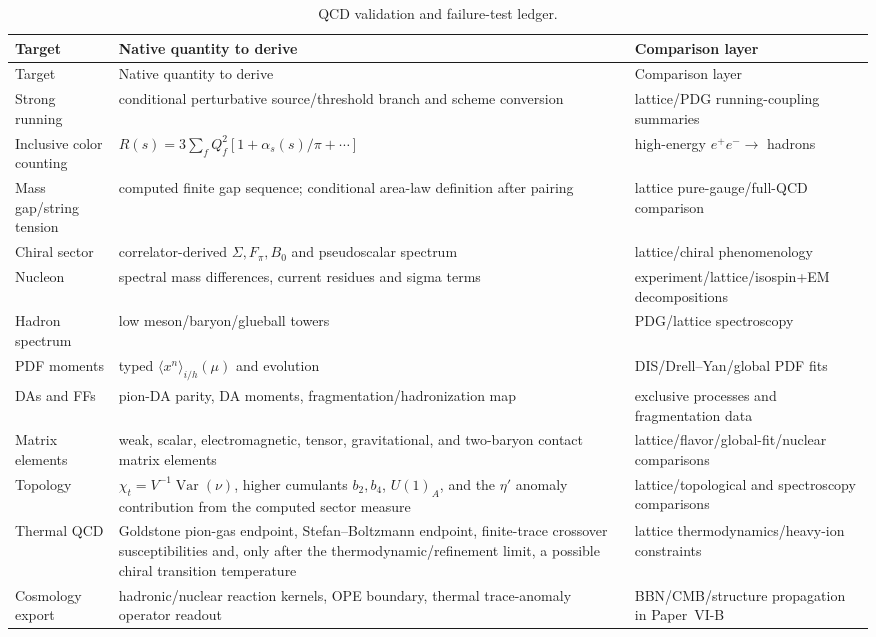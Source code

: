 \documentclass[12pt,a4paper]{article}
\begin{document}
\begin{longtable}{>{\raggedright\arraybackslash}p{} >{\raggedright\arraybackslash}p{} >{\raggedright\arraybackslash}p{}}
\caption[QCD validation and failure-test ledger]{QCD validation and failure-test ledger.}\label{p11:tab:validation-ledger}\\
\toprule
Target & Native quantity to derive & Comparison layer \\
\midrule
\endfirsthead
\toprule
Target & Native quantity to derive & Comparison layer \\
\midrule
\endhead
Strong running & conditional perturbative source/threshold branch and scheme conversion & lattice/PDG running-coupling summaries \\
Inclusive color counting & \(R(s)=3\sum_fQ_f^2[1+\alpha_s(s)/\pi+\cdots]\) & high-energy \(e^+e^-\to\) hadrons \\
Mass gap/string tension & computed finite gap sequence; conditional area-law definition after pairing & lattice pure-gauge/full-QCD comparison \\
Chiral sector & correlator-derived \(\Sigma,F_\pi,B_0\) and pseudoscalar spectrum & lattice/chiral phenomenology \\
Nucleon & spectral mass differences, current residues and sigma terms & experiment/\allowbreak lattice/\allowbreak isospin+EM decompositions \\
Hadron spectrum & low meson/baryon/glueball towers & PDG/lattice spectroscopy \\
PDF moments & typed \(\langle x^n\rangle_{i/h}(\mu)\) and evolution & DIS/Drell--Yan/global PDF fits \\
DAs and FFs & pion-DA parity, DA moments, fragmentation/hadronization map & exclusive processes and fragmentation data \\
Matrix elements & weak, scalar, electromagnetic, tensor, gravitational, and two-baryon contact matrix elements & lattice/flavor/global-fit/nuclear comparisons \\
Topology & \(\chi_t=V^{-1}\operatorname{Var}(\nu)\), higher cumulants \(b_2,b_4\), \(U(1)_A\), and the \(\eta'\) anomaly contribution from the computed sector measure & lattice/topological and spectroscopy comparisons \\
Thermal QCD & Goldstone pion-gas endpoint, Stefan--Boltzmann endpoint, finite-trace crossover susceptibilities and, only after the thermodynamic/refinement limit, a possible chiral transition temperature & lattice thermodynamics/heavy-ion constraints \\
Cosmology export & hadronic/nuclear reaction kernels, OPE boundary, thermal trace-anomaly operator readout & BBN/CMB/structure propagation in Paper~VI-B \\
\bottomrule
\end{longtable}
\end{document}
